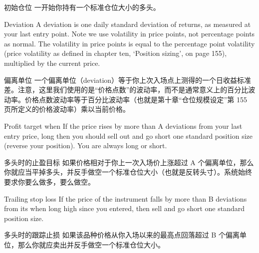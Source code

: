 \begin{chineseblock}初始仓位 一开始你持有一个标准仓位大小的多头。\end{chineseblock}

\bipairgap

\begin{englishblock} Deviation A deviation is one daily standard deviation of returns, as measured at your last entry point. Note we use volatility in price points, not percentage points as normal. The volatility in price points is equal to the percentage point volatility (price volatility as defined in chapter ten, ‘Position sizing', on page 155), multiplied by the current price. \end{englishblock}

\begin{chineseblock}偏离单位 一个偏离单位（deviation）等于你上次入场点上测得的一个日收益标准差。注意，这里我们使用的是“价格点数”的波动率，而不是通常意义上的百分比波动率。价格点数波动率等于百分比波动率（也就是第十章“仓位规模设定”第 155 页所定义的价格波动率）乘以当前价格。\end{chineseblock}

\bipairgap

\begin{englishblock} Profit target when If the price rises by more than A deviations from your last entry price, long then you should sell out and go short one standard position size (reverse your position). You are always long or short. \end{englishblock}

\begin{chineseblock}多头时的止盈目标 如果价格相对于你上一次入场价上涨超过 A 个偏离单位，那么你就应当平掉多头，并反手做空一个标准仓位大小（也就是反转头寸）。系统始终要求你要么做多，要么做空。\end{chineseblock}

\bipairgap

\begin{englishblock} Trailing stop loss If the price of the instrument falls by more than B deviations from its when long high since you entered, then sell and go short one standard position size. \end{englishblock}

\begin{chineseblock}多头时的跟踪止损 如果该品种价格从你入场以来的最高点回落超过 B 个偏离单位，那么你就应卖出并反手做空一个标准仓位大小。\end{chineseblock}

